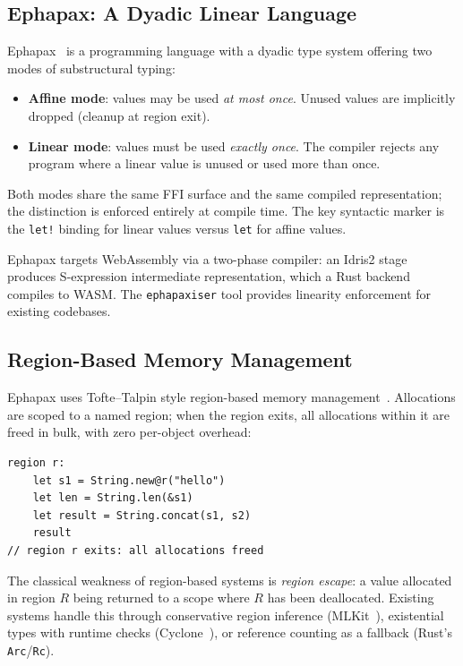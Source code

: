 \documentclass[11pt,a4paper]{article}
\theoremstyle{definition}
\begin{document}
\subsection{Ephapax: A Dyadic Linear Language}

Ephapax~\cite{ephapax2025} is a programming language with a dyadic type
system offering two modes of substructural typing:

\begin{itemize}[nosep]
  \item \textbf{Affine mode}: values may be used \emph{at most once}.
    Unused values are implicitly dropped (cleanup at region exit).
  \item \textbf{Linear mode}: values must be used \emph{exactly once}.
    The compiler rejects any program where a linear value is unused or
    used more than once.
\end{itemize}

Both modes share the same FFI surface and the same compiled
representation; the distinction is enforced entirely at compile time.
The key syntactic marker is the \texttt{let!} binding for linear values
versus \texttt{let} for affine values.

Ephapax targets WebAssembly via a two-phase compiler: an Idris2 stage
produces S-expression intermediate representation, which a Rust backend
compiles to WASM. The \texttt{ephapaxiser} tool provides linearity
enforcement for existing codebases.

\subsection{Region-Based Memory Management}

Ephapax uses Tofte--Talpin style region-based memory
management~\cite{tofte1997}. Allocations are scoped to a named region;
when the region exits, all allocations within it are freed in bulk,
with zero per-object overhead:

\begin{lstlisting}[style=ephapax]
region r:
    let s1 = String.new@r("hello")
    let len = String.len(&s1)
    let result = String.concat(s1, s2)
    result
// region r exits: all allocations freed
\end{lstlisting}

The classical weakness of region-based systems is \emph{region escape}:
a value allocated in region $R$ being returned to a scope where $R$
has been deallocated. Existing systems handle this through conservative
region inference (MLKit~\cite{tofte1997}), existential types with
runtime checks (Cyclone~\cite{jim2002cyclone}), or reference counting
as a fallback (Rust's \texttt{Arc}/\texttt{Rc}).
\end{document}
